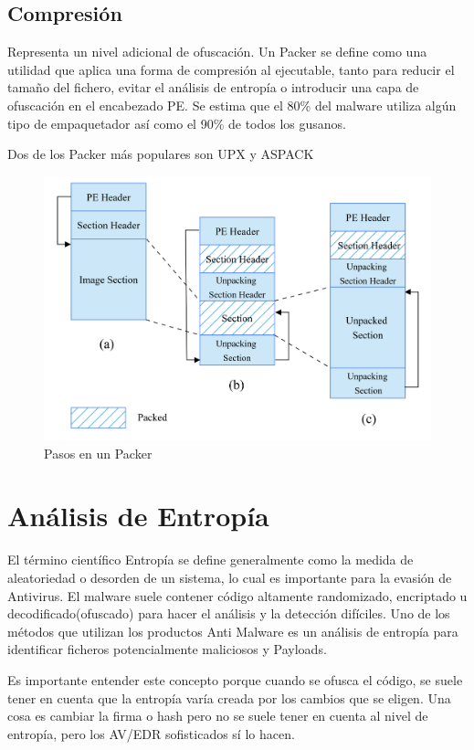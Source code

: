 \documentclass[15pt]{article}
\begin{document}
	\subsection{Compresión}
	Representa un nivel adicional de ofuscación. Un Packer se define como una utilidad que aplica una forma de compresión al ejecutable, tanto para reducir el tamaño del fichero, evitar el análisis de entropía o introducir una capa de ofuscación en el encabezado PE. Se estima que el 80\% del malware utiliza algún tipo de empaquetador así como el 90\% de todos los gusanos.
	
	Dos de los Packer más populares son UPX \cite{upx} y ASPACK \cite{aspack}
	
	\begin{figure}[H]
		\centering
		\includegraphics[width=12cm]{images/packer.png}
		\caption{Pasos en un Packer}
	\end{figure}

	
	\newpage
	\section{Análisis de Entropía\label{entropy}}
	El término científico Entropía se define generalmente como la medida de aleatoriedad o desorden de un sistema, lo cual es importante para la evasión de Antivirus. El malware suele contener código altamente randomizado, encriptado u decodificado(ofuscado) para hacer el análisis y la detección difíciles. Uno de los métodos que utilizan los productos Anti Malware es un análisis de entropía para identificar ficheros potencialmente maliciosos y Payloads.
	
	Es importante entender este concepto porque cuando se ofusca el código, se suele tener en cuenta que la entropía varía creada por los cambios que se eligen. Una cosa es cambiar la firma o hash pero no se suele tener en cuenta al nivel de entropía, pero los AV/EDR sofisticados sí lo hacen.
	
\end{document}
